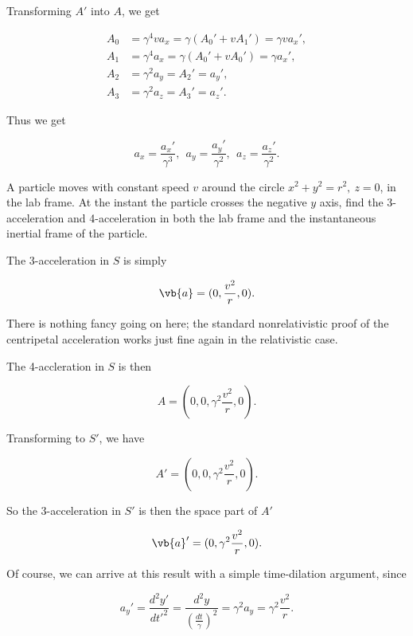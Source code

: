 \documentclass[english,a4paper,12pt]{report}
\begin{document}
Transforming \(A'\) into \(A\), we get 

\begin{equation}
    \begin{aligned}
        A_0 &= \gamma ^{4}va_{x} = \gamma (A_0 ' + vA_1 ') = \gamma v a_{x}', \\
        A_1 &= \gamma ^{4} a_{x} = \gamma (A_0 ' + vA_0 ' ) = \gamma a_{x}', \\
        A_2 &= \gamma ^2 a_{y} = A_2 ' = a_{y}', \\
        A_3 &= \gamma ^2 a_{z} = A_3 ' = a_{z}'.           
    \end{aligned}
\end{equation}

Thus we get

\begin{equation}
    a_{x} = \frac{a_{x}' }{\gamma ^3 }, ~~ a_{y} = \frac{a_{y}' }{\gamma ^2}, ~~ a_{z} = \frac{a_{z}' }{\gamma ^2}.      
\end{equation}

{A particle moves with constant speed \(v\) around the circle \(x^2+y^2=r^2, ~z=0\), in the lab frame. At the instant the particle crosses the negative \(y\) axis, find the 3-acceleration and 4-acceleration in both the lab frame and the instantaneous inertial frame of the particle. }
{The 3-acceleration in \(S\) is simply

\begin{equation}
    \vb{a} = (0,\frac{v^2}{r}, 0 ).
\end{equation}

There is nothing fancy going on here; the standard nonrelativistic proof of the centripetal acceleration works just fine again in the relativistic case. 

The 4-accleration in \(S\) is then 

\begin{equation}
    A = (0,0,\gamma ^2\frac{v^2}{r}, 0 ).
\end{equation}

Transforming to \(S'\), we have 

\begin{equation}
    A' = (0,0, \gamma ^2 \frac{v^2}{r}, 0 ).
\end{equation}

So the 3-acceleration in \(S'\) is then the space part of \(A'\)

\begin{equation}
    \vb{a} ' = (0,\gamma ^2\frac{v^2}{r}, 0 ).
\end{equation}

Of course, we can arrive at this result with a simple time-dilation argument, since

\begin{equation}
    a_{y}' = \frac{d^2y'}{dt'^2} = \frac{d^2y}{(\frac{dt}{\gamma }) ^2} = \gamma ^2 a_{y} = \gamma ^2 \frac{v^2}{r}.     
\end{equation}
}
\end{document}
